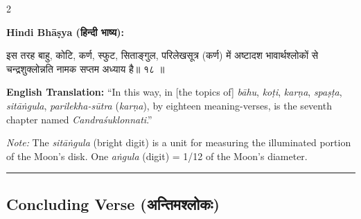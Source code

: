 \documentclass[11pt,a4paper]{article}
\newcommand{\dev}[1]{{\devanagarifont #1}}
\newenvironment{sanskritverse}{%
  \begin{center}\begin{minipage}{0.95\textwidth}
  \setlength{\leftskip}{1em}
  \setlength{\rightskip}{1em}
  \dev
}{\end{minipage}\end{center}}
\begin{document}
\vspace{0.5em}

\begin{paracol}{2}

\noindent\textbf{Hindi Bhāṣya (\dev{हिन्दी भाष्य}):}
\begin{sanskritverse}
इस तरह बाहु, कोटि, कर्ण, स्फुट, सिताङ्गुल, परिलेखसूत्र (कर्ण) में अष्टादश
भावार्थश्लोकों से चन्द्रशुक्लोन्नति नामक सप्तम अध्याय है॥ १८ ॥
\end{sanskritverse}

\switchcolumn

\textbf{English Translation:} ``In this way, in [the topics of] \textit{bāhu}, \textit{koṭi}, \textit{karṇa}, \textit{spaṣṭa}, \textit{sitāṅgula}, \textit{parilekha-sūtra} (\textit{karṇa}), by eighteen meaning-verses, is the seventh chapter named \textit{Candraśuklonnati}.''

\textit{Note:} The \textit{sitāṅgula} (bright digit) is a unit for measuring the illuminated portion of the Moon's disk. One \textit{aṅgula} (digit) = 1/12 of the Moon's diameter.

\end{paracol}

\vspace{1em}
\begin{center}
\textcolor{rulecolor}{\rule{0.8\textwidth}{0.5pt}}
\end{center}

\subsection*{Concluding Verse ({\devanagarifont अन्तिमश्लोकः})}
\end{document}
